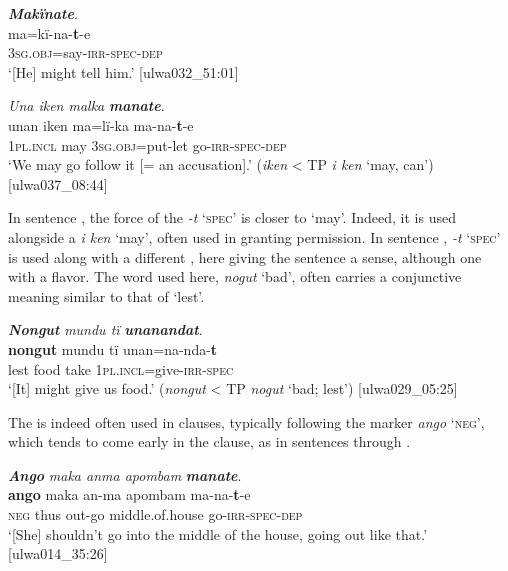 \ea%
    \label{ex:verbs:75}
          \textbf{\textit{Makïnate}}.\\
\gll ma=kï-na-\textbf{t}{}-e\\
    3\textsc{sg.obj}=say-\textsc{irr-spec-dep}\\
\glt `[He] might tell him.’ [ulwa032\_51:01]
\z

\ea%
    \label{ex:verbs:76}
          \textit{Una iken malka} \textbf{\textit{manate}}.\\
\gll unan    iken  ma=lï-ka     ma-na-\textbf{t}{}-e\\
    1\textsc{pl.incl}  may  3\textsc{sg.obj}=put-let  go-\textsc{irr-spec-dep}\\
\glt `We may go follow it [= an accusation].’ (\textit{iken} < TP \textit{i ken} ‘may, can’) [ulwa037\_08:44]
\z

In sentence , the force of the  \textit{-t} ‘\textsc{spec}’ is closer to  ‘may’. Indeed, it is used alongside a   \textit{i ken} ‘may’, often used in granting permission. In sentence , \textit{-t} ‘\textsc{spec}’ is used along with a different  , here giving the sentence a  sense, although one with a  flavor. The  word used here, \textit{nogut} ‘bad’, often carries a conjunctive meaning similar to that of  ‘lest’.

\ea%
    \label{ex:verbs:77}
          \textbf{\textit{Nongut}} \textit{mundu tï} \textbf{\textit{unanandat}}.\\
\gll \textbf{nongut}  mundu  tï    unan=na-nda-\textbf{t}\\
    lest     food   take  1\textsc{pl.incl}=give-\textsc{irr-spec}\\
\glt `[It] might give us food.’ (\textit{nongut} < TP \textit{nogut} ‘bad; lest’) [ulwa029\_05:25]
\z

The   is indeed often used in   clauses, typically following the  marker \textit{ango} ‘\textsc{neg}’, which tends to come early in the clause, as in sentences  through .

\ea%
    \label{ex:verbs:78}
          \textbf{\textit{Ango}} \textit{maka anma apombam} \textbf{\textit{manate}}.\\
\gll \textbf{ango}  maka  an-ma  apombam      ma-na-\textbf{t}{}-e\\
    \textsc{neg}  thus  out-go  middle.of.house  go-\textsc{irr-spec-dep}\\
\glt `[She] shouldn’t go into the middle of the house, going out like that.’ [ulwa014\_35:26]
\z

